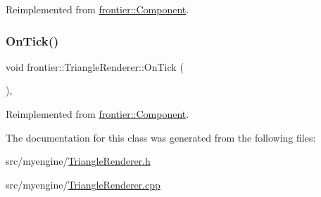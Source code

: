 Reimplemented from \hyperlink{classfrontier_1_1_component_af3da02905c4d79219d9b12f260a35ad1}{frontier\+::\+Component}.

\mbox{\label{classfrontier_1_1_triangle_renderer_a1db716057c1fcc2c10500958a732963b}} 
\subsubsection{\texorpdfstring{On\+Tick()}{OnTick()}}
{\footnotesize\ttfamily void frontier\+::\+Triangle\+Renderer\+::\+On\+Tick (\begin{DoxyParamCaption}{ }\end{DoxyParamCaption})\hspace{0.3cm}{\ttfamily [override]}, {\ttfamily [virtual]}}



Reimplemented from \hyperlink{classfrontier_1_1_component_ab920f9bc07ce051ebb5559c5a66508d1}{frontier\+::\+Component}.



The documentation for this class was generated from the following files\+:\begin{DoxyCompactItemize}
\item 
src/myengine/\hyperlink{_triangle_renderer_8h}{Triangle\+Renderer.\+h}\item 
src/myengine/\hyperlink{_triangle_renderer_8cpp}{Triangle\+Renderer.\+cpp}\end{DoxyCompactItemize}
